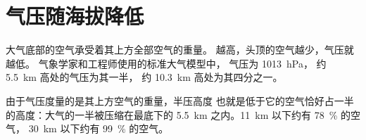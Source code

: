 \section{气压随海拔降低}

大气底部的空气承受着其上方全部空气的重量。
越高，头顶的空气越少，气压就越低。
气象学家和工程师使用的标准大气模型中，
气压为 \qty{1013}{hPa}，
约 \qty{5.5}{km} 高处的气压为其一半，
约 \qty{10.3}{km} 高处为其四分之一。

由于气压度量的是其上方空气的重量，半压高度
也就是低于它的空气恰好占一半的高度：大气的一半被压缩在最底下的
\qty{5.5}{km} 之内。\qty{11}{km} 以下约有 78~\% 的空气，
\qty{30}{km} 以下约有 99~\% 的空气。

